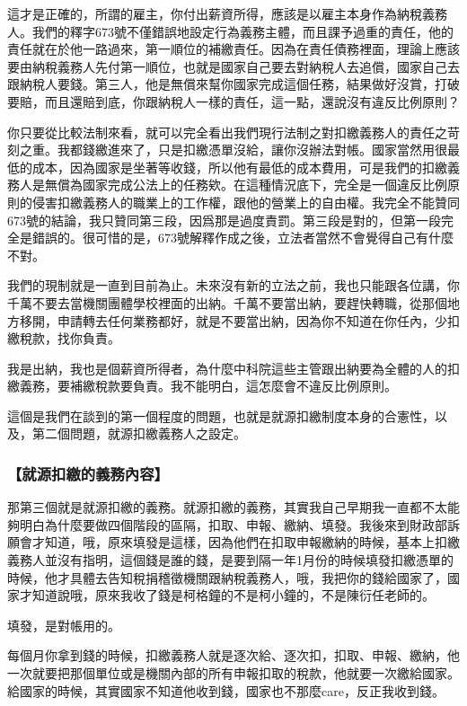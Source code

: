 \documentclass[oneside,sub3section]{ctexbook}
\begin{document}
這才是正確的，所謂的雇主，你付出薪資所得，應該是以雇主本身作為納稅義務人。我們的釋字673號不僅錯誤地設定行為義務主體，而且課予過重的責任，他的責任就在於他一路過來，第一順位的補繳責任。因為在責任債務裡面，理論上應該要由納稅義務人先付第一順位，也就是國家自己要去對納稅人去追償，國家自己去跟納稅人要錢。第三人，他是無償來幫你國家完成這個任務，結果做好沒賞，打破要賠，而且還賠到底，你跟納稅人一樣的責任，這一點，還說沒有違反比例原則？

你只要從比較法制來看，就可以完全看出我們現行法制之對扣繳義務人的責任之苛刻之重。我都錢繳進來了，只是扣繳憑單沒給，讓你沒辦法對帳。國家當然用很最低的成本，因為國家是坐著等收錢，所以他有最低的成本費用，可是我們的扣繳義務人是無償為國家完成公法上的任務欸。在這種情況底下，完全是一個違反比例原則的侵害扣繳義務人的職業上的工作權，跟他的營業上的自由權。我完全不能贊同673號的結論，我只贊同第三段，因爲那是過度責罰。第三段是對的，但第一段完全是錯誤的。很可惜的是，673號解釋作成之後，立法者當然不會覺得自己有什麼不對。

我們的現制就是一直到目前為止。未來沒有新的立法之前，我也只能跟各位講，你千萬不要去當機關團體學校裡面的出納。千萬不要當出納，要趕快轉職，從那個地方移開，申請轉去任何業務都好，就是不要當出納，因為你不知道在你任內，少扣繳稅款，找你負責。

我是出納，我也是個薪資所得者，為什麼中科院這些主管跟出納要為全體的人的扣繳義務，要補繳稅款要負責。我不能明白，這怎麼會不違反比例原則。

這個是我們在談到的第一個程度的問題，也就是就源扣繳制度本身的合憲性，以及，第二個問題，就源扣繳義務人之設定。

\hypertarget{ux5c31ux6e90ux6263ux7e73ux7684ux7fa9ux52d9ux5167ux5bb9}{%
\subsubsection{【就源扣繳的義務內容】}\label{ux5c31ux6e90ux6263ux7e73ux7684ux7fa9ux52d9ux5167ux5bb9}}

那第三個就是就源扣繳的義務。就源扣繳的義務，其實我自己早期我一直都不太能夠明白為什麼要做四個階段的區隔，扣取、申報、繳納、填發。我後來到財政部訴願會才知道，哦，原來填發是這樣，因為他們在扣取申報繳納的時候，基本上扣繳義務人並沒有指明，這個錢是誰的錢，是要到隔一年1月份的時候填發扣繳憑單的時候，他才具體去告知稅捐稽徵機關跟納稅義務人，哦，我把你的錢給國家了，國家才知道說哦，原來我收了錢是柯格鐘的不是柯小鐘的，不是陳衍任老師的。

填發，是對帳用的。

每個月你拿到錢的時候，扣繳義務人就是逐次給、逐次扣，扣取、申報、繳納，他一次就要把那個單位或是機關內部的所有申報扣取的稅款，他就要一次繳給國家。給國家的時候，其實國家不知道他收到錢，國家也不那麼care，反正我收到錢。
\end{document}
